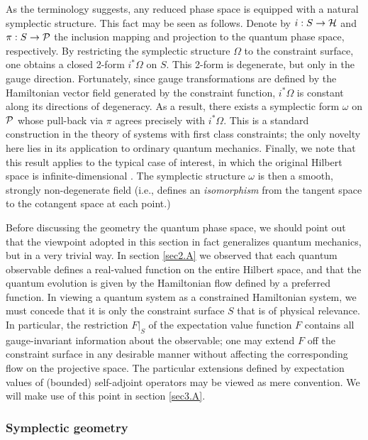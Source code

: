 \documentclass[12pt,aps,eqsecnum,tighten,nofootinbib]{revtex4-2}
\def\H{{\cal H}}
\def\P{{\cal P}}
\def\w{\omega}
\def\W{\Omega}
\begin{document}
As the terminology suggests, any reduced phase space is equipped with
a natural symplectic structure.  This fact may be seen as follows.
Denote by $i:S\rightarrow\H$ and $\pi:S\rightarrow\P$ the inclusion
mapping and projection to the quantum phase space, respectively.  By
restricting the symplectic structure $\W$ to the constraint surface,
one obtains a closed 2-form $i^*\W$ on $S$.  This 2-form is
degenerate, but only in the gauge direction.  Fortunately, since gauge
transformations are defined by the Hamiltonian vector field generated
by the constraint function, $i^*\W$ is constant along its directions
of degeneracy.  As a result, there exists a symplectic form $\w$ on
$\P$ whose pull-back via $\pi$ agrees precisely with $i^*\W$. This is
a standard construction in the theory of systems with first class
constraints; the only novelty here lies in its application to ordinary
quantum mechanics.  Finally, we note that this result applies to the
typical case of interest, in which the original Hilbert space is
infinite-dimensional \cite{thesis}. The symplectic structure $\omega$
is then a smooth, strongly non-degenerate field (i.e., defines an {\it
isomorphism} from the tangent space to the cotangent space at each
point.)

Before discussing the geometry the quantum phase space, we should
point out that the viewpoint adopted in this section in fact
generalizes quantum mechanics, but in a very trivial way.  In section
\ref{sec2.A} we observed that each quantum observable defines a
real-valued function on the entire Hilbert space, and that the quantum
evolution is given by the Hamiltonian flow defined by a preferred
function.  In viewing a quantum system as a constrained Hamiltonian
system, we must concede that it is only the constraint surface $S$
that is of physical relevance.  In particular, the restriction $F|_S$
of the expectation value function $F$ contains all gauge-invariant
information about the observable; one may extend $F$ off the
constraint surface in any desirable manner without affecting the
corresponding flow on the projective space.  The particular extensions
defined by expectation values of (bounded) self-adjoint operators may
be viewed as mere convention.  We will make use of this point in
section \ref{sec3.A}.


\subsubsection{Symplectic geometry}
\end{document}
